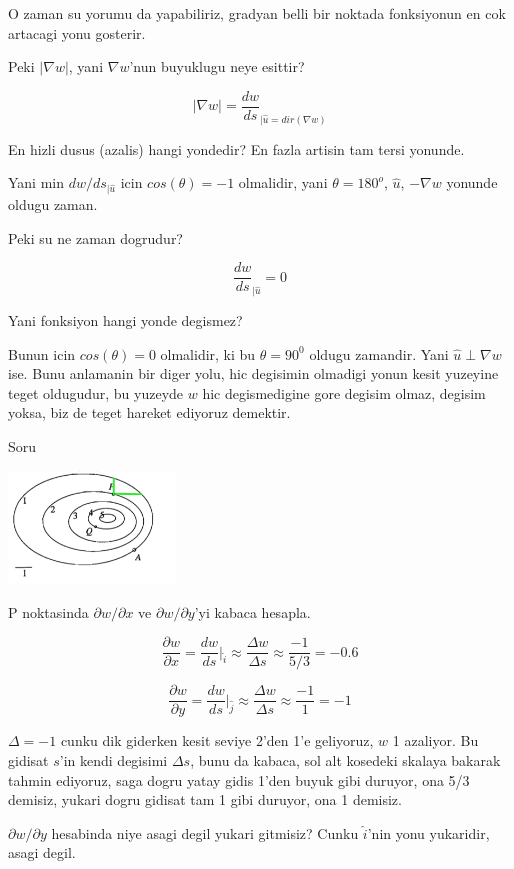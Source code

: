 \documentclass[12pt,fleqn]{article}\usepackage{../common}
\begin{document}
O zaman su yorumu da yapabiliriz, gradyan belli bir noktada fonksiyonun en
cok artacagi yonu gosterir. 

Peki $|\nabla w|$, yani $\nabla w$'nun buyuklugu neye esittir? 

\[ |\nabla w| =   \frac{dw}{ds}_{|\hat{u}=dir(\nabla w)}  \]

En hizli dusus (azalis) hangi yondedir? En fazla artisin tam tersi
yonunde. 

Yani min $dw/ds_{|\hat{u}}$ icin $cos(\theta) = -1$ olmalidir, yani $\theta =
180^o$,  $\hat{u}$, $-\nabla w$ 
yonunde oldugu zaman.

Peki su ne zaman dogrudur? 

\[ \frac{dw}{ds}_{|\hat{u}} = 0 \]

Yani fonksiyon hangi yonde degismez? 

Bunun icin $cos(\theta) = 0$ olmalidir, ki bu $\theta = 90^0$ oldugu
zamandir. Yani $\hat{u} \perp \nabla w$ ise. Bunu anlamanin bir diger yolu,
hic degisimin olmadigi yonun kesit yuzeyine teget oldugudur, bu yuzeyde $w$
hic degismedigine gore degisim olmaz, degisim yoksa, biz de teget hareket
ediyoruz demektir. 

Soru

\includegraphics[height=3cm]{2d9.png}

P noktasinda $\partial w/ \partial x$ ve $\partial w/\partial y$'yi kabaca hesapla. 

\[ \frac{\partial w}{\partial x} = \frac{dw}{ds} \bigg|_{\hat{i}} \approx
\frac{\Delta w}{\Delta s} \approx
\frac{-1}{5/3} = -0.6
\]

\[ \frac{\partial w}{\partial y} = \frac{dw}{ds} \bigg|_{\hat{j}} \approx
\frac{\Delta w}{\Delta s} \approx
\frac{-1}{1} = -1
\]

$\Delta = -1$ cunku dik giderken kesit seviye 2'den 1'e geliyoruz, $w$ 1
azaliyor. Bu gidisat $s$'in kendi degisimi $\Delta s$, bunu da kabaca, sol
alt kosedeki skalaya bakarak tahmin ediyoruz, saga dogru yatay gidis 1'den
buyuk gibi duruyor, ona 5/3 demisiz, yukari dogru gidisat tam 1 gibi
duruyor, ona 1 demisiz. 

$\partial w / \partial y$ hesabinda niye asagi degil yukari gitmisiz? Cunku
$\hat{i}$'nin yonu yukaridir, asagi degil. 
\end{document}
